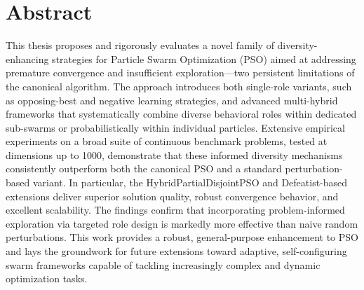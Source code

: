 \thispagestyle{plain}
%
%
%

\chapter*{Abstract}


This thesis proposes and rigorously evaluates a novel family of diversity-enhancing strategies for Particle Swarm Optimization (PSO) aimed at addressing premature convergence and insufficient exploration—two persistent limitations of the canonical algorithm. The approach introduces both single-role variants, such as opposing-best and negative learning strategies, and advanced multi-hybrid frameworks that systematically combine diverse behavioral roles within dedicated sub-swarms or probabilistically within individual particles. Extensive empirical experiments on a broad suite of continuous benchmark problems, tested at dimensions up to 1000, demonstrate that these informed diversity mechanisms consistently outperform both the canonical PSO and a standard perturbation-based variant. In particular, the HybridPartialDisjointPSO and Defeatist-based extensions deliver superior solution quality, robust convergence behavior, and excellent scalability. The findings confirm that incorporating problem-informed exploration via targeted role design is markedly more effective than naive random perturbations. This work provides a robust, general-purpose enhancement to PSO and lays the groundwork for future extensions toward adaptive, self-configuring swarm frameworks capable of tackling increasingly complex and dynamic optimization tasks.




\MediaOptionLogicBlank